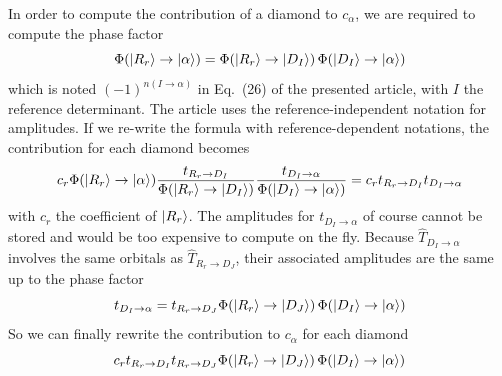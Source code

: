 \documentclass[./thesis.tex]{subfiles}
\begin{document}
In order to compute the contribution of a diamond to $c_\alpha$, we are required to compute the phase factor
\begin{equation}
{\Phi \qty(\ket {R_r} \rightarrow {\ket{\alpha}})} = {\Phi \qty(\ket {R_r} \rightarrow \ket {D_I})}\, {\Phi \qty(\ket {D_I} \rightarrow {\ket{\alpha}})}
\end{equation}
which is noted $(-1)^{n(I \rightarrow \alpha)}$ in Eq.~(26) of the presented article, with $I$ the reference determinant. The article uses the reference-independent notation for amplitudes. If we re-write the formula with reference-dependent notations, the contribution for each diamond becomes
\begin{equation}
c_r {\Phi \qty(\ket {R_r} \rightarrow {\ket{\alpha}})} \frac{t_{R_r \rightarrow D_I}}{{\Phi \qty(\ket {R_r} \rightarrow \ket {D_I})}} \frac{t_{D_I \rightarrow \alpha}}{{\Phi \qty(\ket {D_I} \rightarrow {\ket{\alpha}})}} =c_r t_{R_r \rightarrow D_I} t_{D_I \rightarrow \alpha}
\end{equation}
with $c_r$ the coefficient of $\ket {R_r}$.
The amplitudes for $t_{D_I \rightarrow \alpha}$ of course cannot be stored and would be too expensive to compute on the fly. Because $\hat T_{D_I \rightarrow \alpha}$ involves the same orbitals as $\hat T_{R_r \rightarrow D_J}$, their associated amplitudes are the same up to the phase factor
\begin{equation}
t_{D_I \rightarrow \alpha} = t_{R_r \rightarrow D_J} {\Phi \qty(\ket {R_r} \rightarrow \ket {D_J})} \, {\Phi \qty(\ket {D_I} \rightarrow {\ket{\alpha}})}
\end{equation}
So we can finally rewrite the contribution to $c_\alpha$ for each diamond
\begin{equation}
c_r t_{R_r \rightarrow D_I} t_{R_r \rightarrow D_J} {\Phi \qty(\ket {R_r} \rightarrow \ket {D_J})}\,{\Phi \qty(\ket {D_I} \rightarrow {\ket{\alpha}})}
\end{equation}
\end{document}
